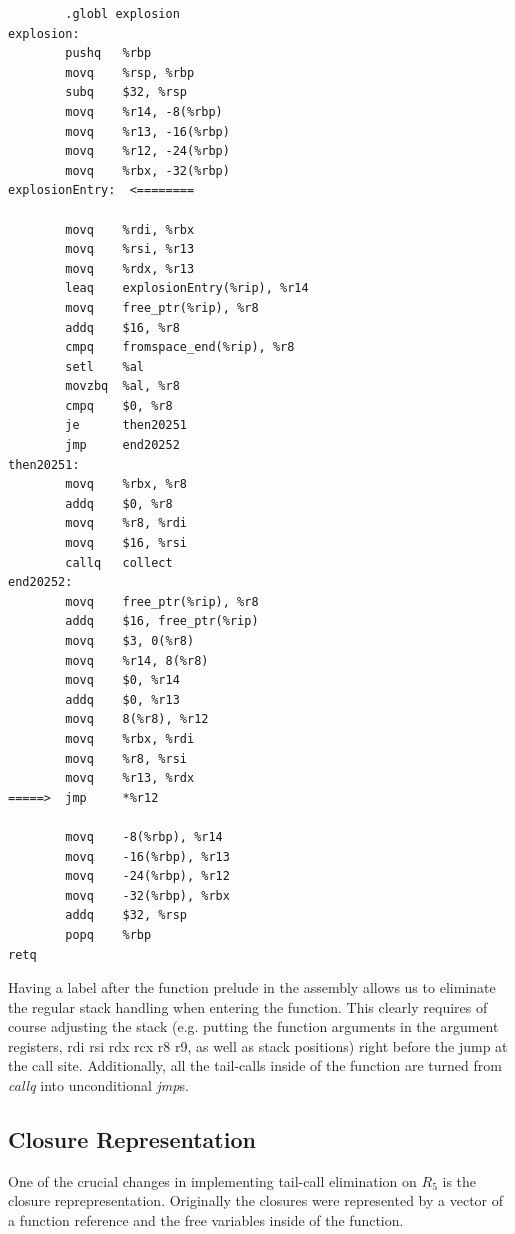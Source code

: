 \documentclass[12pt]{article}
\begin{document}
\begin{multicols}{2}
\begin{verbatim}
        .globl explosion
explosion:
        pushq   %rbp
        movq    %rsp, %rbp
        subq    $32, %rsp
        movq    %r14, -8(%rbp)
        movq    %r13, -16(%rbp)
        movq    %r12, -24(%rbp)
        movq    %rbx, -32(%rbp)
explosionEntry:  <========

        movq    %rdi, %rbx
        movq    %rsi, %r13
        movq    %rdx, %r13
        leaq    explosionEntry(%rip), %r14
        movq    free_ptr(%rip), %r8
        addq    $16, %r8
        cmpq    fromspace_end(%rip), %r8
        setl    %al
        movzbq  %al, %r8
        cmpq    $0, %r8
        je      then20251
        jmp     end20252
then20251:
        movq    %rbx, %r8
        addq    $0, %r8
        movq    %r8, %rdi
        movq    $16, %rsi
        callq   collect
end20252:
        movq    free_ptr(%rip), %r8
        addq    $16, free_ptr(%rip)
        movq    $3, 0(%r8)
        movq    %r14, 8(%r8)
        movq    $0, %r14
        addq    $0, %r13
        movq    8(%r8), %r12
        movq    %rbx, %rdi
        movq    %r8, %rsi
        movq    %r13, %rdx
=====>  jmp     *%r12

        movq    -8(%rbp), %r14
        movq    -16(%rbp), %r13
        movq    -24(%rbp), %r12
        movq    -32(%rbp), %rbx
        addq    $32, %rsp
        popq    %rbp
retq	
\end{verbatim}
\end{multicols}

Having a label after the function prelude in the assembly allows us to
eliminate the regular stack handling when entering the function. This
clearly requires of course adjusting the stack (e.g. putting the
function arguments in the argument registers, rdi rsi rdx rcx r8 r9,
as well as stack positions) right before the jump at the call
site. Additionally, all the tail-calls inside of the function are
turned from \emph{callq} into unconditional \emph{jmp}s.

\subsection{Closure Representation}

One of the crucial changes in implementing tail-call elimination on
$R_5$ is the closure reprepresentation. Originally the closures were
represented by a vector of a function reference and the free variables
inside of the function.
\end{document}
